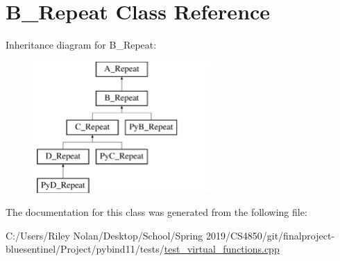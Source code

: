 \hypertarget{class_b___repeat}{}\section{B\+\_\+\+Repeat Class Reference}
\label{class_b___repeat}
Inheritance diagram for B\+\_\+\+Repeat\+:\begin{figure}[H]
\begin{center}
\leavevmode
\includegraphics[height=5.000000cm]{class_b___repeat}
\end{center}
\end{figure}


The documentation for this class was generated from the following file\+:\begin{DoxyCompactItemize}
\item 
C\+:/\+Users/\+Riley Nolan/\+Desktop/\+School/\+Spring 2019/\+C\+S4850/git/finalproject-\/bluesentinel/\+Project/pybind11/tests/\mbox{\hyperlink{test__virtual__functions_8cpp}{test\+\_\+virtual\+\_\+functions.\+cpp}}\end{DoxyCompactItemize}
